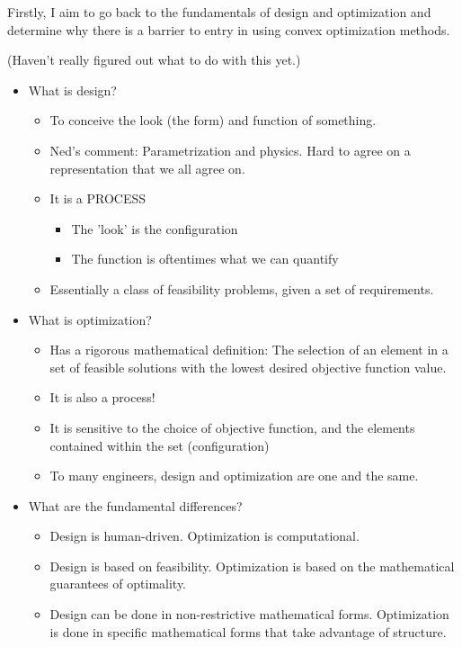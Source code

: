 \documentclass{aiaa-pretty}
\begin{document}
Firstly, I aim to go back to the fundamentals of design and optimization and determine why there is a barrier to entry in using convex optimization methods.

(Haven't really figured out what to do with this yet.)

\begin{itemize}
\item What is design? 
\begin{itemize}
\item To conceive the look (the form) and function of something. 
\item Ned's comment: Parametrization and physics. Hard to agree on a representation that we all agree on. 
\item It is a PROCESS
\begin{itemize}
	\item The 'look' is the configuration
	\item The function is oftentimes what we can quantify
\end{itemize}
\item Essentially a class of feasibility problems, given a set of requirements. 
\end{itemize}
\item What is optimization?
\begin{itemize}
\item Has a rigorous mathematical definition: The selection of an element in a set of feasible solutions with the lowest desired objective function value. 
\item It is also a process!
\item It is sensitive to the choice of objective function, and the elements contained within the set (configuration)
\item To many engineers, design and optimization are one and the same. 
\end{itemize}
\item What are the fundamental differences? 
\begin{itemize}
\item Design is human-driven. Optimization is computational. 
\item Design is based on feasibility. Optimization is based on the mathematical guarantees of optimality. 
\item Design can be done in non-restrictive mathematical forms. Optimization is done in specific mathematical forms that take advantage of structure. 
\end{itemize}
\end{itemize}
\end{document}
